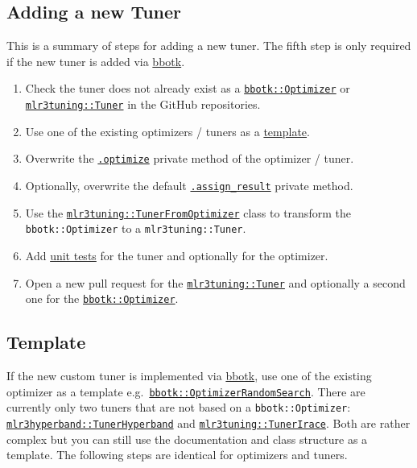 \documentclass[
]{scrbook}
\providecommand{\tightlist}{%
  \setlength{\itemsep}{0pt}\setlength{\parskip}{0pt}}
\begin{document}
\hypertarget{extending-tuners-summary}{%
\subsection{Adding a new Tuner}\label{extending-tuners-summary}}

This is a summary of steps for adding a new tuner.
The fifth step is only required if the new tuner is added via \href{https://bbotk.mlr-org.com}{bbotk}.

\begin{enumerate}
\def\labelenumi{\arabic{enumi}.}
\tightlist
\item
  Check the tuner does not already exist as a \href{https://github.com/mlr-org/bbotk/tree/master/R}{\texttt{bbotk::Optimizer}} or \href{https://github.com/mlr-org/mlr3tuning/tree/master/R}{\texttt{mlr3tuning::Tuner}} in the GitHub repositories.
\item
  Use one of the existing optimizers / tuners as a \protect\hyperlink{tuner-template}{template}.
\item
  Overwrite the \protect\hyperlink{tuner-optimize}{\texttt{.optimize}} private method of the optimizer / tuner.
\item
  Optionally, overwrite the default \protect\hyperlink{tuner-add-result}{\texttt{.assign\_result}} private method.
\item
  Use the \protect\hyperlink{tuner-from-optimizer}{\texttt{mlr3tuning::TunerFromOptimizer}} class to transform the \texttt{bbotk::Optimizer} to a \texttt{mlr3tuning::Tuner}.
\item
  Add \protect\hyperlink{tuner-test}{unit tests} for the tuner and optionally for the optimizer.
\item
  Open a new pull request for the \href{https://github.com/mlr-org/mlr3tuning/pulls}{\texttt{mlr3tuning::Tuner}} and optionally a second one for the \href{https://github.com/mlr-org/bbotk/pulls}{\texttt{bbotk::Optimizer}}.
\end{enumerate}

\hypertarget{tuner-template}{%
\subsection{Template}\label{tuner-template}}

If the new custom tuner is implemented via \href{https://bbotk.mlr-org.com}{bbotk}, use one of the existing optimizer as a template e.g.~\href{https://github.com/mlr-org/bbotk/blob/master/R/OptimizerRandomSearch.R}{\texttt{bbotk::OptimizerRandomSearch}}. There are currently only two tuners that are not based on a \texttt{bbotk::Optimizer}: \href{https://github.com/mlr-org/mlr3hyperband/blob/master/R/TunerHyperband.R}{\texttt{mlr3hyperband::TunerHyperband}} and \href{https://github.com/mlr-org/mlr3tuning/blob/master/R/TunerIrace.R}{\texttt{mlr3tuning::TunerIrace}}. Both are rather complex but you can still use the documentation and class structure as a template. The following steps are identical for optimizers and tuners.
\end{document}
